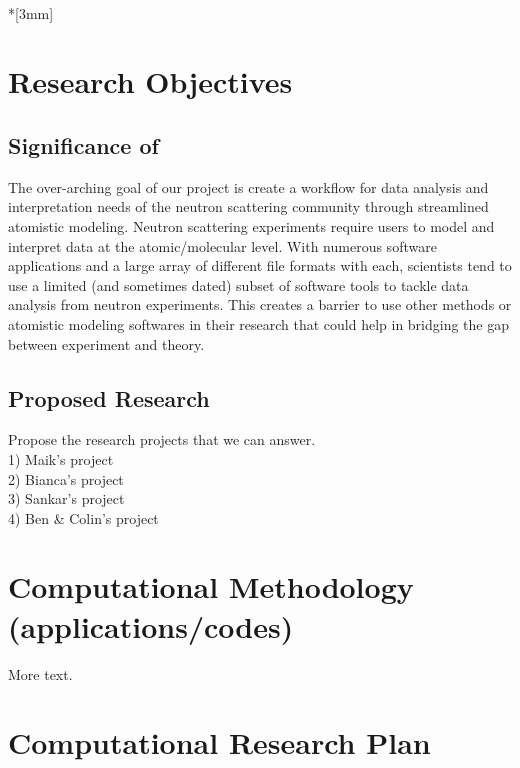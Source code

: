 \documentclass{proposalnsf}
\begin{document}
\\*[3mm]

\renewcommand{\thepage} {\arabic{page}}



\section*{Research Objectives}

\subsection*{Significance of  }

The over-arching goal of our project is create a workflow for data analysis and interpretation
needs of the neutron scattering community through streamlined atomistic modeling. Neutron scattering experiments require users to model and interpret data at the atomic/molecular level. With numerous software applications and a large array of different file formats with each, scientists tend to use a limited (and sometimes dated) subset of software tools to tackle data analysis from neutron experiments. This creates a barrier to use other methods or atomistic modeling softwares in their research that could help in bridging the gap between experiment and theory. 

\subsection*{Proposed Research}

Propose the research projects that we can answer.  \\
  1) Maik's project \\
  2) Bianca's project \\
  3) Sankar's project \\
  4) Ben \& Colin's project \\


\section*{Computational Methodology (applications/codes)}

More text.

\section*{Computational Research Plan}
\end{document}
